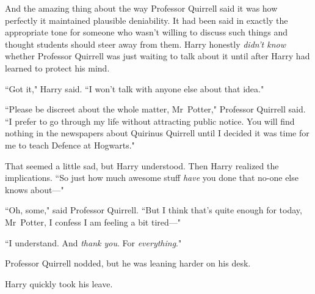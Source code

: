 And the amazing thing about the way Professor Quirrell said it was how perfectly it maintained plausible deniability. It had been said in exactly the appropriate tone for someone who wasn't willing to discuss such things and thought students should steer away from them. Harry honestly \emph{didn't know} whether Professor Quirrell was just waiting to talk about it until after Harry had learned to protect his mind.

``Got it," Harry said. ``I won't talk with anyone else about that idea."

``Please be discreet about the whole matter, Mr~Potter," Professor Quirrell said. ``I prefer to go through my life without attracting public notice. You will find nothing in the newspapers about Quirinus Quirrell until I decided it was time for me to teach Defence at Hogwarts."

That seemed a little sad, but Harry understood. Then Harry realized the implications. ``So just how much awesome stuff \emph{have} you done that no-one else knows about—"

``Oh, some," said Professor Quirrell. ``But I think that's quite enough for today, Mr~Potter, I confess I am feeling a bit tired—"

``I understand. And \emph{thank you}. For \emph{everything}."

Professor Quirrell nodded, but he was leaning harder on his desk.

Harry quickly took his leave.

